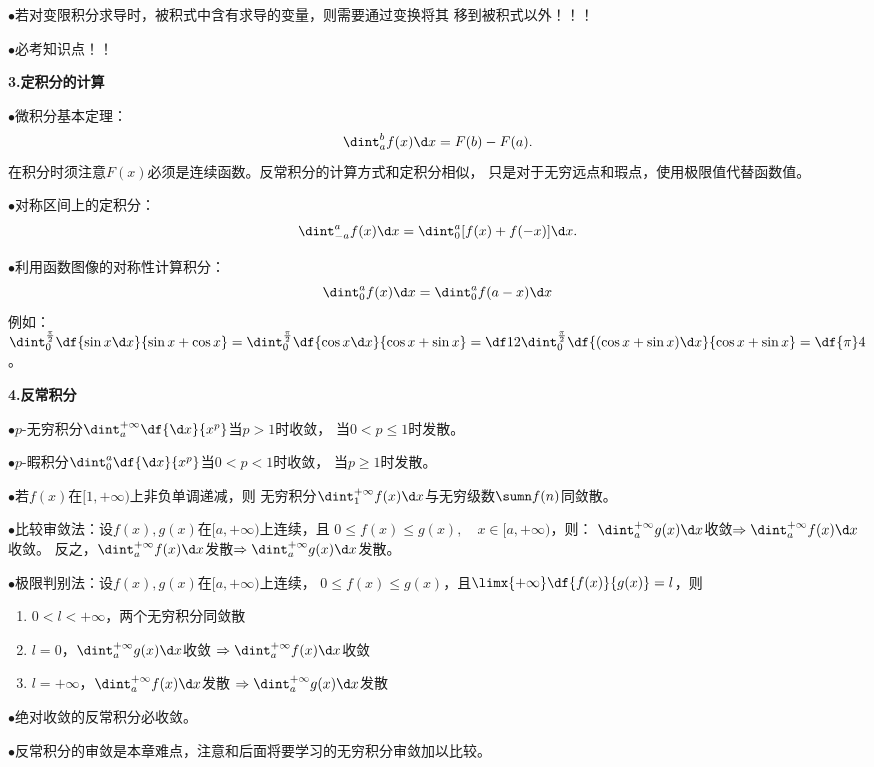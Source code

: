 $\bullet$若对变限积分求导时，被积式中含有求导的变量，则需要通过变换将其
移到被积式以外！！！

$\bullet$必考知识点！！

{\bf 3.定积分的计算}

$\bullet$微积分基本定理：
$$\dint_a^bf(x)\d x=F(b)-F(a).$$
在积分时须注意$F(x)$必须是连续函数。反常积分的计算方式和定积分相似，
只是对于无穷远点和瑕点，使用极限值代替函数值。

$\bullet$对称区间上的定积分：
$$\dint_{-a}^af(x)\d x=\dint_0^a[f(x)+f(-x)]\d x.$$

$\bullet$利用函数图像的对称性计算积分：
$$\dint_0^af(x)\d x=\dint_0^af(a-x)\d x$$
例如：$\dint_0^{\frac{\pi}2}\df{\sin x\d x}{\sin x+\cos x}
=\dint_0^{\frac{\pi}2}\df{\cos x\d x}{\cos x+\sin x}
=\df12\dint_0^{\frac{\pi}2}\df{(\cos x+\sin x)\d x}{\cos x+\sin x}=\df{\pi}4$。

{\bf 4.反常积分}

$\bullet$$p$-无穷积分$\dint_a^{+\infty}\df{\d x}{x^p}$当$p>1$时收敛，
当$0<p\leq1$时发散。

$\bullet$$p$-暇积分$\dint_0^a\df{\d x}{x^p}$当$0<p<1$时收敛，
当$p\geq1$时发散。

$\bullet$若$f(x)$在$[1,+\infty)$上非负单调递减，则
无穷积分$\dint_1^{+\infty}f(x)\d x$与无穷级数$\sumn f(n)$同敛散。

$\bullet$比较审敛法：设$f(x),g(x)$在$[a,+\infty)$上连续，且
$0\leq f(x)\leq g(x),\quad x\in[a,+\infty)$，则：
$\dint_a^{+\infty}g(x)\d x$收敛$\Rightarrow\dint_a^{+\infty}f(x)\d x$收敛。
反之，$\dint_a^{+\infty}f(x)\d x$发散$\Rightarrow\dint_a^{+\infty}g(x)\d x$发散。

$\bullet$极限判别法：设$f(x),g(x)$在$[a,+\infty)$上连续，
$0\leq f(x)\leq g(x)$，且$\limx{+\infty}\df{f(x)}{g(x)}=l$，则
 \begin{enumerate}[(1)]
  \setlength{\itemindent}{1cm}
  \item $0<l<+\infty$，两个无穷积分同敛散 
  \item
  $l=0$，$\dint_a^{+\infty}g(x)\d x$收敛
  $\Rightarrow\dint_a^{+\infty}f(x)\d x$收敛 
  \item
  $l=+\infty$，$\dint_a^{+\infty}f(x)\d x$发散
  $\Rightarrow\dint_a^{+\infty}g(x)\d x$发散
\end{enumerate}

$\bullet$绝对收敛的反常积分必收敛。

$\bullet$反常积分的审敛是本章难点，注意和后面将要学习的无穷积分审敛加以比较。